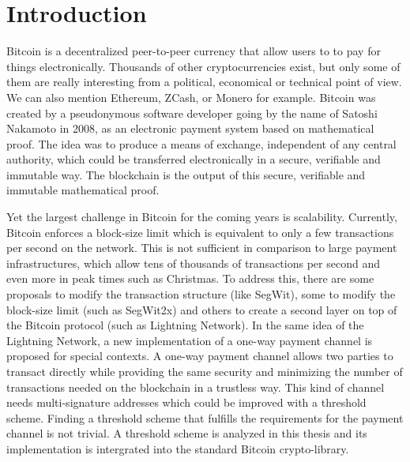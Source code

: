 \chapter{Introduction}
\label{chap:introduction}

Bitcoin is a decentralized peer-to-peer currency that allow users to to pay for
things electronically. Thousands of other
cryptocurrencies exist, but only some of them are really interesting from a political,
economical or technical point of view. We can also mention Ethereum, ZCash, or Monero
for example.
Bitcoin was created by a pseudonymous software developer going by the name of
Satoshi Nakamoto in 2008, as an electronic payment system based on mathematical proof.
The idea was to produce a means of exchange, independent of any central authority,
which could be transferred electronically in a secure, verifiable and immutable way.
The blockchain is the output of this secure, verifiable and immutable mathematical proof.

Yet the largest challenge in Bitcoin for the coming years is scalability. Currently, Bitcoin enforces
a block-size limit which is equivalent to only a few transactions per second on the network. This
is not sufficient in comparison to large payment infrastructures, which allow tens of
thousands of transactions per second and even more in peak times such as Christmas.  To address this, there are some proposals to modify the
transaction structure (like SegWit), some to modify the block-size limit
(such as SegWit2x) and others to create a second layer on top of the Bitcoin protocol
(such as Lightning Network). In the same idea of the Lightning Network,
a new implementation of a one-way payment channel is proposed for special contexts.
A one-way payment channel allows two parties to transact directly while providing the same security and
minimizing the number of transactions needed on the blockchain in a trustless way.
This kind of channel needs multi-signature addresses which could be improved with a threshold scheme.
Finding a threshold scheme that fulfills the requirements for the payment channel
is not trivial. A threshold scheme is analyzed in this thesis and its implementation
is intergrated into the standard Bitcoin crypto-library.

